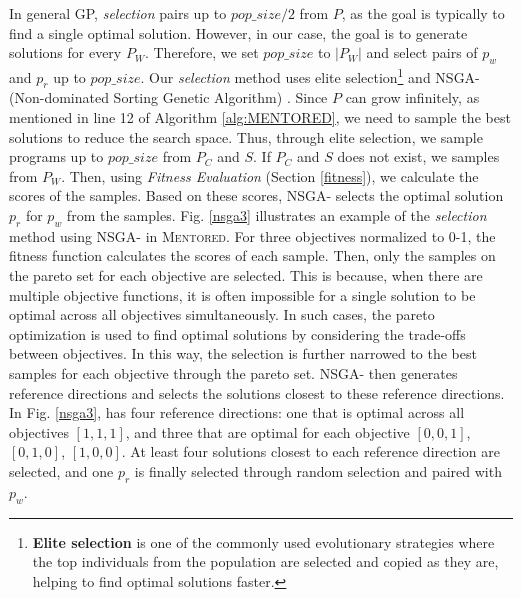 \documentclass[10pt,conference]{IEEEtran}
\begin{document}
        In general GP, \textit{selection} pairs up to $pop\_size/2$ from $P$, as the goal is typically to find a single optimal solution. However, in our case, the goal is to generate solutions for every $P_{W}$. Therefore, we set $pop\_size$ to $|P_{W}|$ and select pairs of $p_{w}$ and $p_{r}$ up to $pop\_size$. Our \textit{selection} method uses elite selection\footnote{\textbf{Elite selection} is one of the commonly used evolutionary strategies where the top individuals from the population are selected and copied as they are, helping to find optimal solutions faster.} and NSGA-\uppercase\expandafter{} (Non-dominated Sorting Genetic Algorithm) \cite{blank2019investigating}. Since $P$ can grow infinitely, as mentioned in line 12 of Algorithm \ref{alg:MENTORED}, we need to sample the best solutions to reduce the search space. Thus, through elite selection, we sample programs up to $pop\_size$ from $P_{C}$ and $S$. If $P_{C}$ and $S$ does not exist, we samples from $P_{W}$. Then, using \textit{Fitness Evaluation} (Section \ref{fitness}), we calculate the scores of the samples. Based on these scores, NSGA-\uppercase\expandafter{} selects the optimal solution $p_{r}$ for $p_{w}$ from the samples. Fig. \ref{nsga3} illustrates an example of the \textit{selection} method using NSGA-\uppercase\expandafter{} in \textsc{Mentored}. For three objectives normalized to 0-1, the fitness function calculates the scores of each sample. Then, only the samples on the pareto set for each objective are selected. This is because, when there are multiple objective functions, it is often impossible for a single solution to be optimal across all objectives simultaneously. In such cases, the pareto optimization is used to find optimal solutions by considering the trade-offs between objectives. In this way, the selection is further narrowed to the best samples for each objective through the pareto set. NSGA-\uppercase\expandafter{} then generates reference directions and selects the solutions closest to these reference directions. In Fig. \ref{nsga3}, has four reference directions: one that is optimal across all objectives $[1,1,1]$, and three that are optimal for each objective $[0,0,1]$, $[0,1,0]$, $[1,0,0]$. At least four solutions closest to each reference direction are selected, and one $p_{r}$ is finally selected through random selection and paired with $p_{w}$.
\end{document}
